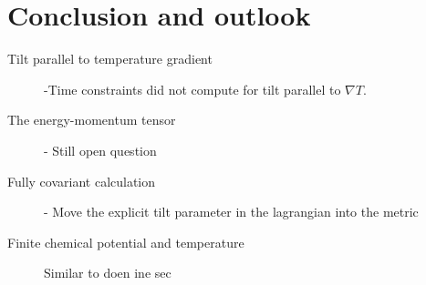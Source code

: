 \section{Conclusion and outlook}


\begin{description}
  \item[Tilt parallel to temperature gradient]
        -Time constraints did not compute for tilt parallel to \( \nabla T \).

  \item[The energy-momentum tensor]
        - Still open question

  \item[Fully covariant calculation]
        - Move the explicit tilt parameter in the lagrangian into the metric

  \item[Finite chemical potential and temperature]
        Similar to doen ine sec
\end{description}
